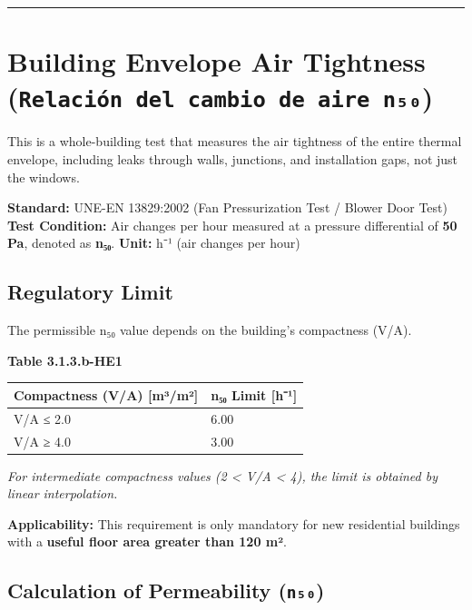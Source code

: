 \documentclass[
  10pt,
  letterpaper,
]{scrbook}
\begin{document}
\begin{center}\rule{0.5\linewidth}{0.5pt}\end{center}

\section{\texorpdfstring{Building Envelope Air Tightness
(\texttt{Relación\ del\ cambio\ de\ aire\ n₅₀})}{Building Envelope Air Tightness (Relación del cambio de aire n₅₀)}}\label{building-envelope-air-tightness-relaciuxf3n-del-cambio-de-aire-nux2085ux2080}

This is a whole-building test that measures the air tightness of the
entire thermal envelope, including leaks through walls, junctions, and
installation gaps, not just the windows.

\textbf{Standard:} UNE-EN 13829:2002 (Fan Pressurization Test / Blower
Door Test) \textbf{Test Condition:} Air changes per hour measured at a
pressure differential of \textbf{50 Pa}, denoted as \textbf{n₅₀}.
\textbf{Unit:} h⁻¹ (air changes per hour)

\subsection{Regulatory Limit}\label{regulatory-limit}

The permissible n₅₀ value depends on the building's compactness (V/A).

\textbf{Table 3.1.3.b-HE1}

\begin{longtable}[]{@{}ll@{}}
\toprule\noalign{}
Compactness (V/A) {[}m³/m²{]} & n₅₀ Limit {[}h⁻¹{]} \\
\midrule\noalign{}
\endhead
\bottomrule\noalign{}
\endlastfoot
V/A ≤ 2.0 & 6.00 \\
V/A ≥ 4.0 & 3.00 \\
\end{longtable}

\emph{For intermediate compactness values (2 \textless{} V/A \textless{}
4), the limit is obtained by linear interpolation.}

\textbf{Applicability:} This requirement is only mandatory for new
residential buildings with a \textbf{useful floor area greater than 120
m²}.

\subsection{\texorpdfstring{Calculation of Permeability
(\texttt{n₅₀})}{Calculation of Permeability (n₅₀)}}\label{calculation-of-permeability-nux2085ux2080}
\end{document}
